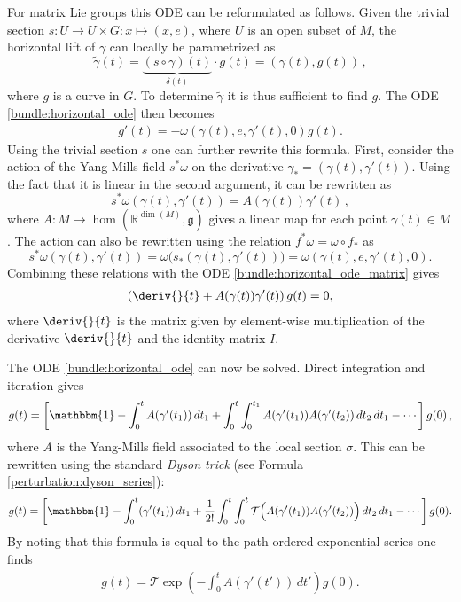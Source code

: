     \begin{example}
         For matrix Lie groups this ODE can be reformulated as follows. Given the trivial section $s:U\rightarrow U\times G:x\mapsto(x,e)$, where $U$ is an open subset of $M$, the horizontal lift of $\gamma$ can locally be parametrized as \[\widetilde{\gamma}(t) = \underbrace{(s\circ\gamma)(t)}_{\delta(t)}\cdot g(t) = (\gamma(t),g(t))\,,\] where $g$ is a curve in $G$. To determine $\widetilde{\gamma}$ it is thus sufficient to find $g$. The ODE \eqref{bundle:horizontal_ode} then becomes
        \begin{gather}
            \label{bundle:horizontal_ode_matrix}
            g'(t) = -\omega(\gamma(t),e,\gamma'(t),0)g(t).
        \end{gather}
        Using the trivial section $s$ one can further rewrite this formula. First, consider the action of the Yang-Mills field $s^*\omega$ on the derivative $\gamma_* = (\gamma(t),\gamma'(t))$. Using the fact that it is linear in the second argument, it can be rewritten as \[s^*\omega(\gamma(t),\gamma'(t)) = A(\gamma(t))\gamma'(t)\,,\] where $A:M\rightarrow\hom(\mathbb{R}^{\dim(M)},\mathfrak{g})$ gives a linear map for each point $\gamma(t)\in M$. The action can also be rewritten using the relation $f^*\omega=\omega\circ f_\ast$ as \[s^*\omega(\gamma(t),\gamma'(t)) = \omega\big(s_\ast(\gamma(t),\gamma'(t))\big) = \omega(\gamma(t),e,\gamma'(t),0).\] Combining these relations with the ODE \eqref{bundle:horizontal_ode_matrix} gives
        \begin{gather}
            \label{bundle:horizontal_ode_derivative}
            \left(\deriv{}{t} + A(\gamma(t))\gamma'(t)\right)g(t) = 0,
        \end{gather}
        where $\deriv{}{t}$ is the matrix given by element-wise multiplication of the derivative $\deriv{}{t}$ and the identity matrix $I$.

        The ODE \eqref{bundle:horizontal_ode} can now be solved. Direct integration and iteration gives
        \begin{gather}
            g(t) = \left[\mathbbm{1} - \int_0^tA(\gamma'(t_1))\,dt_1 + \int_0^t\int_0^{t_1}A(\gamma'(t_1))A(\gamma'(t_2))\,dt_2\,dt_1-\cdots\right]g(0)\,,
        \end{gather}
        where $A$ is the Yang-Mills field associated to the local section $\sigma$. This can be rewritten using the standard \textit{Dyson trick} (see Formula \ref{perturbation:dyson_series}):
        \begin{gather}
            g(t) = \left[\mathbbm{1} - \int_0^t(\gamma'(t_1))\,dt_1 + \frac{1}{2!}\int_0^t\int_0^t\mathcal{T}\Big(A(\gamma'(t_1))A(\gamma'(t_2))\Big)\,dt_2\,dt_1-\cdots\right]g(0).
        \end{gather}
        By noting that this formula is equal to the path-ordered exponential series one finds
        \begin{gather}
            \label{bundle:g0_to_gt}
            g(t) = \mathcal{T}\exp\left(-\int_0^tA(\gamma'(t'))\,dt'\right)g(0).
        \end{gather}
    \end{example}

